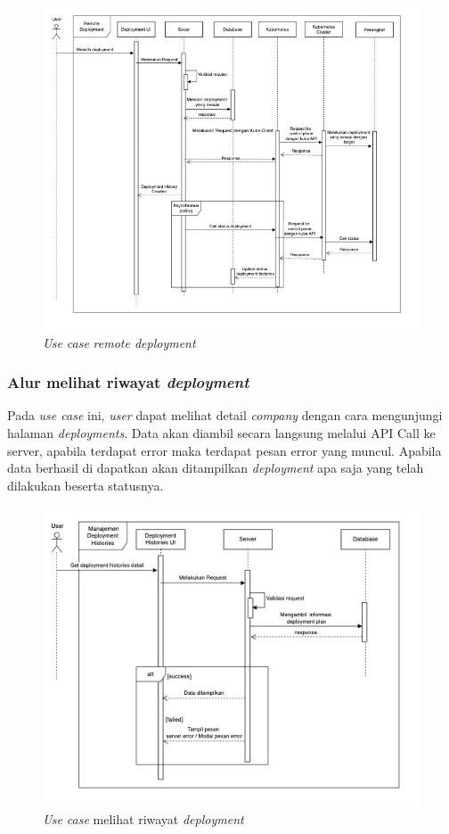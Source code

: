\begin{figure}[ht]
  \centering
  \includegraphics[width=1\textwidth]{resources/chapter-3/usecase/uc-12.jpg}
  \caption{\textit{Use case} \textit{remote deployment}}
  \label{fig:usecase-12}
\end{figure}

\pagebreak

\subsubsection{Alur melihat riwayat \textit{deployment}}

Pada \textit{use case} ini, \textit{user} dapat melihat detail \textit{company} dengan cara mengunjungi halaman \textit{deployments}. Data akan diambil secara langsung melalui API Call ke server, apabila terdapat error maka terdapat pesan error yang muncul. Apabila data berhasil di dapatkan akan ditampilkan \textit{deployment} apa saja yang telah dilakukan beserta statusnya.

\begin{figure}[ht]
  \centering
  \includegraphics[width=1\textwidth]{resources/chapter-3/usecase/uc-13.jpg}
  \caption{\textit{Use case} melihat riwayat \textit{deployment}}
  \label{fig:usecase-13}
\end{figure}

\pagebreak